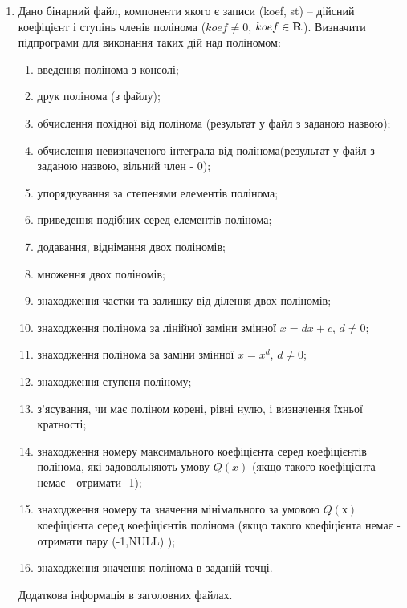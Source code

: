 \documentclass[]{article}
\makeatletter
\newcommand{\xslalph}[1]{\expandafter\@xslalph\csname c@#1\endcsname}
\newcommand{\@xslalph}[1]{%
    \ifcase#1\or а\or б\or в\or г\or д\or e\or є\or ж\or з\or i%
    \or й\or к\or л\or м\or н\or о\or п\or р\or с\or т%
    \or у\or ф\or х\or ц\or ч\or ш\or ю\or я\or аа\or бб\or вв %
    \else\@ctrerr\fi%
}
\makeatother
\begin{document}
\begin{enumerate}
\item
Дано бінарний файл, компоненти якого є записи (koef, st) -- дійсний коефіцієнт і
ступінь членів полінома ($koef \neq 0$, $koef \in \bf{R}$). Визначити підпрограми для виконання
таких дій над поліномом:
\begin{enumerate}[label=\xslalph*)]
\item введення полінома з консолі;
\item друк полінома (з файлу);
\item обчислення похідної від полінома (результат у файл з заданою назвою);
\item обчислення невизначеного інтеграла від полінома(результат у файл з заданою назвою, вільний член - 0);
\item упорядкування за степенями елементів полінома;
\item приведення подібних серед елементів полінома;
\item додавання, віднімання двох поліномів;
\item множення двох поліномів;
\item знаходження частки та залишку від ділення двох поліномів;
\item знаходження полінома за лінійної заміни змінної $x = dx + c$, $d \neq 0$;
\item знаходження полінома за заміни змінної $x = x^{d}$, $d \neq 0$;
\item знаходження ступеня поліному;
\item з'ясування, чи має поліном корені, рівні нулю, і визначення їхньої
кратності;
\item знаходження номеру максимального коефіцієнта серед
коефіцієнтів полінома, які задовольняють умову $Q(x)$ 
(якщо такого коефіцієнта немає - отримати -1);
\item знаходження номеру та значення мінімального за умовою $Q(х)$ коефіцієнта серед
коефіцієнтів полінома (якщо такого коефіцієнта немає - отримати
пару (-1,NULL) );
\item знаходження значення полінома в заданій точці.
\end{enumerate}

Додаткова інформація в заголовних файлах.

\end{enumerate}
\end{document}
